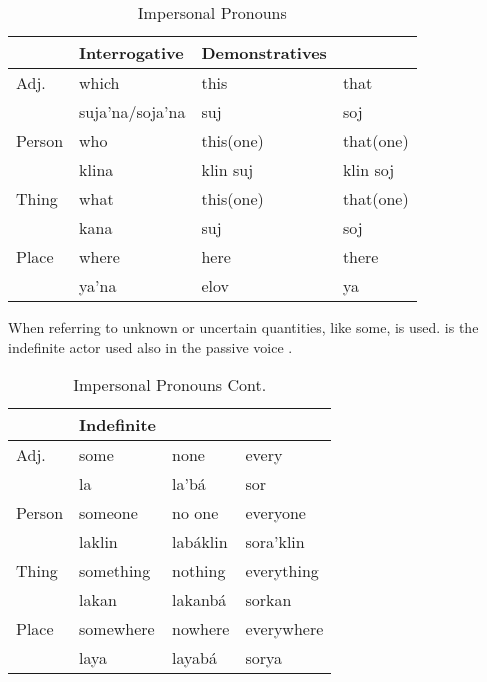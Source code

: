 \begin{table}[ht]
	\caption{Impersonal Pronouns}
	\centering
	\begin{tabular}{ l l l l   }
		\toprule
				& Interrogative 			& Demonstratives 			& 				\\	
		\midrule
		Adj. 	& which 					& this 			 			& that 			\\	
				& suja'na/soja'na 			& suj 						& soj 			\\	
		Person 	& who 						& this(one) 				& that(one) 	\\
				& klina					 	& klin suj 					& klin soj		\\
		Thing 	& what 						& this(one) 				& that(one) 	\\
				& kana		     			& suj 						& soj 	 		\\
		Place 	& where 					& here 						& there 		\\
				& ya'na 					& elov		 				& ya 			\\
		\bottomrule
	\end{tabular}
	\label{table:impersonal_pronouns_1}
\end{table}

When referring to unknown or uncertain quantities, like some,  is used.  is the 
indefinite actor used also in the passive voice .

\begin{table}[ht]
	\caption{Impersonal Pronouns Cont.}
	\centering
	\begin{tabular}{ l l l l }
		\toprule
				& Indefinite 			& 					& 							\\
		\midrule
		Adj. 	& some 					& none 				& every 					\\
				& la 		  			& la'b\'{a} 		& sor 						\\
		Person 	& someone 				& no one 			& everyone 					\\
				& laklin 				& lab\'{a}klin 		& sora'klin 				\\
		Thing 	& something 			& nothing 			& everything 				\\
				& lakan			 		& lakanb\'{a} 		& sorkan 					\\
		Place 	& somewhere 			& nowhere 			& everywhere 				\\
				& laya 					& layab\'{a} 		& sorya 					\\
		\bottomrule
	\end{tabular}
	\label{table:impersonal_pronouns_2}
\end{table}

